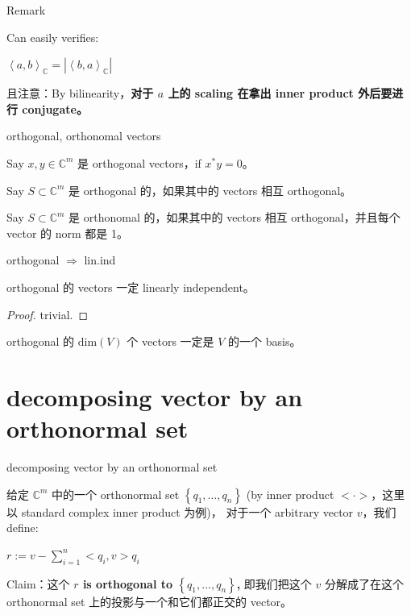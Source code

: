 \begin{qlremark}{Remark}

Can easily verifies:

\(\left\langle {a,b} \right\rangle_{\mathbb{C}} = \left| \left\langle {b,a} \right\rangle_{\mathbb{C}} \right|\)

且注意：By bilinearity，\textbf{对于 \(a\) 上的 scaling 在拿出 inner product 外后要进行 conjugate。}

\end{qlremark}

\begin{definition}{orthogonal, orthonomal vectors}

Say \(x,y \in \mathbb{C}^{m}\) 是 orthogonal vectors，if \(x^{\ast}y = 0\)。

Say \(S \subset \mathbb{C}^{m}\) 是 orthogonal 的，如果其中的 vectors 相互 orthogonal。

Say \(S \subset \mathbb{C}^{m}\) 是 orthonomal 的，如果其中的 vectors 相互 orthogonal，并且每个 vector 的 norm 都是 1。

\end{definition}

\begin{theorem}{orthogonal \(\Rightarrow\) lin.ind}

orthogonal 的 vectors 一定 linearly independent。

\end{theorem}

\begin{proof}

trivial.

\end{proof}

\begin{corollary}

orthogonal 的 \(\text{dim}(V)\) 个 vectors 一定是 \(V\) 的一个 basis。

\end{corollary}

\section{decomposing vector by an orthonormal set}

\begin{theorem}{decomposing vector by an orthonormal set}

给定 \(\mathbb{C}^{m}\) 中的一个 orthonormal set \(\left\{ {q_{1},\ldots,q_{n}} \right\}\) (by inner product \(< \cdot >\)，这里以 standard complex inner product 为例)， 对于一个 arbitrary vector \(v\)，我们 define:

\(r := v - \sum_{i = 1}^{n} < q_{i},v > q_{i}\)

Claim：这个 \textbf{\(r\) is orthogonal to \(\left\{ {q_{1},\ldots,q_{n}} \right\}\),} 即我们把这个 \(v\) 分解成了在这个 orthonormal set 上的投影与一个和它们都正交的 vector。

\end{theorem}

